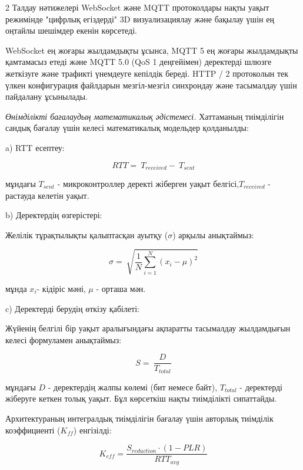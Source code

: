 \begin{multicols}{2}
Талдау нәтижелері WebSocket және MQTT
протоколдары нақты уақыт режимінде "цифрлық егіздерді" 3D
визуализациялау және бақылау үшін ең оңтайлы шешімдер екенін көрсетеді.

WebSocket ең жоғары жылдамдықты ұсынса, MQTT 5
ең жоғары жылдамдықты қамтамасыз етеді және MQTT 5.0 (QoS 1 деңгейімен)
деректерді шлюзге жеткізуге және трафикті үнемдеуге кепілдік береді.
HTTP / 2 протоколын тек үлкен конфигурация файлдарын мезгіл-мезгіл
синхрондау және тасымалдау үшін пайдалану ұсынылады.

\emph{Өнімділікті бағалаудың математикалық әдістемесі.} Хаттаманың
тиімділігін сандық бағалау үшін келесі математикалық модельдер
қолданылды:

a) RTT есептеу:

\begin{equation}
RTT = \ T_{received} - \ T_{sent}
\end{equation}

мұндағы \(T_{sent}\) - микроконтроллер деректі жіберген уақыт
белгісі,\(T_{received}\) - растауда келетін уақыт.

b) Деректердің өзгерістері:

Желілік тұрақтылықты қалыптасқан ауытқу (\(\sigma\)) арқылы анықтаймыз:

\begin{equation}
\sigma = \ \sqrt{\frac{1}{N}\sum_{i = 1}^{N}\left( x_{i} - \mu \right)^{2}}
\end{equation}

мұнда \(x_{i}\)- кідіріс мәні, \(\mu\) - орташа мән.

c) Деректерді берудің өткізу қабілеті:

Жүйенің белгілі бір уақыт аралығындағы ақпаратты тасымалдау жылдамдығын
келесі формуламен анықтаймыз:

\begin{equation}
S = \ \frac{D}{T_{total}}
\end{equation}

мұндағы \(D\) - деректердің жалпы көлемі (бит немесе байт),
\(T_{total}\) - деректерді жіберуге кеткен толық уақыт. Бұл көрсеткіш
нақты тиімділікті сипаттайды.

Архитектураның интегралдық тиімділігін бағалау үшін авторлық тиімділік
коэффициенті (\(K_{ff}\)) енгізілді:

\begin{equation}
K_{eff} = \frac{S_{reduction} \cdot (1 - PLR)}{{RTT}_{avg}}
\end{equation}


\end{multicols}
